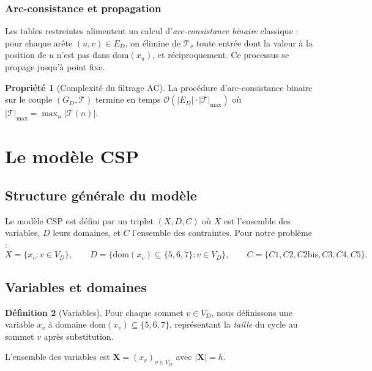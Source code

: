 \documentclass[12pt,a4paper]{article}
\theoremstyle{definition}
\newtheorem{definition}{D\'efinition}[section]
\newtheorem{propriete}[definition]{Propri\'et\'e}
\theoremstyle{remark}
\newcommand{\GD}{G_{\!D}}
\newcommand{\VD}{V_{\!D}}
\newcommand{\ED}{E_{\!D}}
\newcommand{\xv}{x_v}
\newcommand{\dom}{\mathrm{dom}}
\newcommand{\bigO}{\mathcal{O}}
\begin{document}
\subsubsection{Arc-consistance et propagation}

Les tables restreintes alimentent un calcul d'\emph{arc-consistance binaire}
classique : pour chaque ar\^ete $(u, v) \in \ED$, on \'elimine de
$\mathcal{T}_v$ toute entr\'ee dont la valeur \`a la position de $u$ n'est
pas dans $\dom(x_u)$, et r\'eciproquement. Ce processus se propage jusqu'\`a
point fixe.

\begin{propriete}[Complexit\'e du filtrage AC]
La proc\'edure d'arc-consistance binaire sur le couple
$(\GD, \mathcal{T})$ termine en temps
$\bigO(|\ED| \cdot |\mathcal{T}|_{\max})$
o\`u $|\mathcal{T}|_{\max} = \max_n |\mathcal{T}(n)|$.
\end{propriete}

\section{Le mod\`ele CSP}
\label{sec:csp}

\subsection{Structure g\'en\'erale du mod\`ele}

Le mod\`ele CSP est d\'efini par un triplet $(X, D, C)$ o\`u $X$ est
l'ensemble des variables, $D$ leurs domaines, et $C$ l'ensemble des
contraintes. Pour notre probl\`eme :
\[
  X = \{\xv : v \in \VD\}, \qquad
  D = \{\dom(\xv) \subseteq \{5, 6, 7\} : v \in \VD\}, \qquad
  C = \{C1, C2, C2\text{bis}, C3, C4, C5\}.
\]

\subsection{Variables et domaines}

\begin{definition}[Variables]
Pour chaque sommet $v \in \VD$, nous d\'efinissons une variable
$\xv$ \`a domaine $\dom(\xv) \subseteq \{5, 6, 7\}$, repr\'esentant la
\emph{taille} du cycle au sommet $v$ apr\`es substitution.
\end{definition}

L'ensemble des variables est $\mathbf{X} = (\xv)_{v \in \VD}$ avec
$|\mathbf{X}| = h$.
\end{document}
